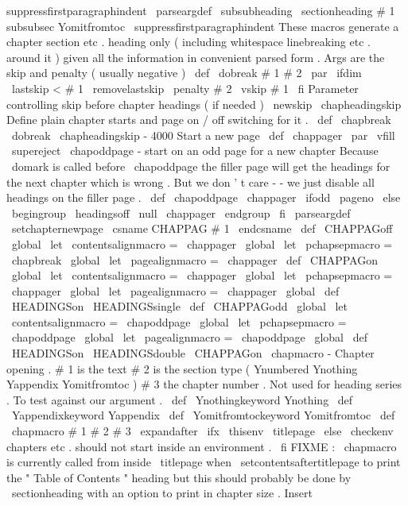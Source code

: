 {{{{suppressfirstparagraphindent
}
\
parseargdef
\
subsubheading
{
\
sectionheading
{
#
1
}
{
subsubsec
}
{
Yomitfromtoc
}
{
}
\
suppressfirstparagraphindent
}
%
These
macros
generate
a
chapter
section
etc
.
heading
only
%
(
including
whitespace
linebreaking
etc
.
around
it
)
%
given
all
the
information
in
convenient
parsed
form
.
%
Args
are
the
skip
and
penalty
(
usually
negative
)
\
def
\
dobreak
#
1
#
2
{
\
par
\
ifdim
\
lastskip
<
#
1
\
removelastskip
\
penalty
#
2
\
vskip
#
1
\
fi
}
%
Parameter
controlling
skip
before
chapter
headings
(
if
needed
)
\
newskip
\
chapheadingskip
%
Define
plain
chapter
starts
and
page
on
/
off
switching
for
it
.
\
def
\
chapbreak
{
\
dobreak
\
chapheadingskip
{
-
4000
}
}
%
Start
a
new
page
\
def
\
chappager
{
\
par
\
vfill
\
supereject
}
%
\
chapoddpage
-
start
on
an
odd
page
for
a
new
chapter
%
Because
\
domark
is
called
before
\
chapoddpage
the
filler
page
will
%
get
the
headings
for
the
next
chapter
which
is
wrong
.
But
we
don
'
t
%
care
-
-
we
just
disable
all
headings
on
the
filler
page
.
\
def
\
chapoddpage
{
%
\
chappager
\
ifodd
\
pageno
\
else
\
begingroup
\
headingsoff
\
null
\
chappager
\
endgroup
\
fi
}
\
parseargdef
\
setchapternewpage
{
\
csname
CHAPPAG
#
1
\
endcsname
}
\
def
\
CHAPPAGoff
{
%
\
global
\
let
\
contentsalignmacro
=
\
chappager
\
global
\
let
\
pchapsepmacro
=
\
chapbreak
\
global
\
let
\
pagealignmacro
=
\
chappager
}
\
def
\
CHAPPAGon
{
%
\
global
\
let
\
contentsalignmacro
=
\
chappager
\
global
\
let
\
pchapsepmacro
=
\
chappager
\
global
\
let
\
pagealignmacro
=
\
chappager
\
global
\
def
\
HEADINGSon
{
\
HEADINGSsingle
}
}
\
def
\
CHAPPAGodd
{
%
\
global
\
let
\
contentsalignmacro
=
\
chapoddpage
\
global
\
let
\
pchapsepmacro
=
\
chapoddpage
\
global
\
let
\
pagealignmacro
=
\
chapoddpage
\
global
\
def
\
HEADINGSon
{
\
HEADINGSdouble
}
}
\
CHAPPAGon
%
\
chapmacro
-
Chapter
opening
.
%
%
#
1
is
the
text
#
2
is
the
section
type
(
Ynumbered
Ynothing
%
Yappendix
Yomitfromtoc
)
#
3
the
chapter
number
.
%
Not
used
for
heading
series
.
%
%
To
test
against
our
argument
.
\
def
\
Ynothingkeyword
{
Ynothing
}
\
def
\
Yappendixkeyword
{
Yappendix
}
\
def
\
Yomitfromtockeyword
{
Yomitfromtoc
}
%
\
def
\
chapmacro
#
1
#
2
#
3
{
%
\
expandafter
\
ifx
\
thisenv
\
titlepage
\
else
\
checkenv
{
}
%
chapters
etc
.
should
not
start
inside
an
environment
.
\
fi
%
FIXME
:
\
chapmacro
is
currently
called
from
inside
\
titlepage
when
%
\
setcontentsaftertitlepage
to
print
the
"
Table
of
Contents
"
heading
but
%
this
should
probably
be
done
by
\
sectionheading
with
an
option
to
print
%
in
chapter
size
.
%
%
Insert
}}}}
